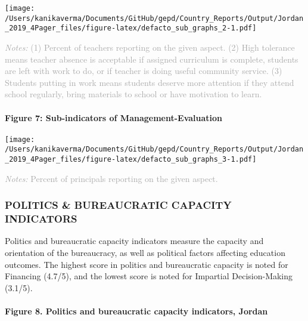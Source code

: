 \documentclass[
  twocolumn]{article}
\begin{document}
\texttt{[image: /Users/kanikaverma/Documents/GitHub/gepd/Country\_Reports/Output/Jordan\_2019\_4Pager\_files/figure-latex/defacto\_sub\_graphs\_2-1.pdf]}

{\scriptsize
    \textcolor{darkgray}{\textit{Notes:} (1) Percent of teachers reporting on the given aspect. (2) High tolerance means teacher absence is acceptable if assigned curriculum is complete, students are left with work to do, or if teacher is doing useful community service. (3) Students putting in work means students deserve more attention if they attend school regularly, bring materials to school or have motivation to learn.}
  }

\hypertarget{figure-7-sub-indicators-of-management-evaluation}{%
\paragraph{Figure 7: Sub-indicators of
Management-Evaluation}\label{figure-7-sub-indicators-of-management-evaluation}}

\texttt{[image: /Users/kanikaverma/Documents/GitHub/gepd/Country\_Reports/Output/Jordan\_2019\_4Pager\_files/figure-latex/defacto\_sub\_graphs\_3-1.pdf]}

{\scriptsize
    \textcolor{darkgray}{\textit{Notes:} Percent of principals reporting on the given aspect.}
  }

\vfill\null

\hypertarget{politics-bureaucratic-capacity-indicators}{%
\subsubsection{\texorpdfstring{\textbf{POLITICS \& BUREAUCRATIC CAPACITY
INDICATORS}}{POLITICS \& BUREAUCRATIC CAPACITY INDICATORS}}\label{politics-bureaucratic-capacity-indicators}}

Politics and bureaucratic capacity indicators measure the capacity and
orientation of the bureaucracy, as well as political factors affecting
education outcomes. The highest score in politics and bureaucratic
capacity is noted for Financing (4.7/5), and the lowest score is noted
for Impartial Decision-Making (3.1/5).

\hypertarget{figure-8.-politics-and-bureaucratic-capacity-indicators-jordan}{%
\paragraph{Figure 8. Politics and bureaucratic capacity indicators,
Jordan}\label{figure-8.-politics-and-bureaucratic-capacity-indicators-jordan}}
\end{document}
